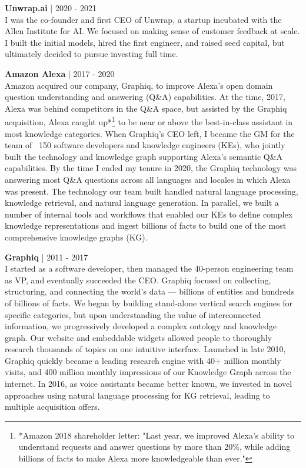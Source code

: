 \documentclass[a4paper,10pt]{article}
\begin{document}
\vspace{5pt} %

\noindent
\textbf{Unwrap.ai} | 2020 - 2021 \\
I was the co-founder and first CEO of Unwrap, a startup incubated with the Allen Institute for AI. We focused on making sense of customer feedback at scale. I built the initial models, hired the first engineer, and raised seed capital, but ultimately decided to pursue investing full time.

\vspace{5pt} %

\noindent
\textbf{Amazon Alexa} | 2017 - 2020 \\
Amazon acquired our company, Graphiq, to improve Alexa's open domain question understanding and answering (Q\&A) capabilities. At the time, 2017, Alexa was behind competitors in the Q\&A space, but assisted by the Graphiq acquisition, Alexa caught up*\footnote{*Amazon 2018 shareholder letter: "Last year, we improved Alexa’s ability to understand requests and answer questions by more than 20\%, while adding billions of facts to make Alexa more knowledgeable than ever."}  to be near or above the best-in-class assistant in most knowledge categories. When Graphiq's CEO left, I became the GM for the team of ~150 software developers and knowledge engineers (KEs), who jointly built the technology and knowledge graph supporting Alexa's semantic Q\&A capabilities. By the time I ended my tenure in 2020, the Graphiq technology was answering most Q\&A questions across all languages and locales in which Alexa was present. The technology our team built handled natural language processing, knowledge retrieval, and natural language generation. In parallel, we built a number of internal tools and workflows that enabled our KEs to define complex knowledge representations and ingest billions of facts to build one of the most comprehensive knowledge graphs (KG).

\vspace{5pt} %

\noindent
\textbf{Graphiq} | 2011 - 2017 \\
I started as a software developer, then managed the 40-person engineering team as VP, and eventually succeeded the CEO. Graphiq focused on collecting, structuring, and connecting the world’s data — billions of entities and hundreds of billions of facts. We began by building stand-alone vertical search engines for specific categories, but upon understanding the value of interconnected information, we progressively developed a complex ontology and knowledge graph. Our website and embeddable widgets allowed people to thoroughly research thousands of topics on one intuitive interface. Launched in late 2010, Graphiq quickly became a leading research engine with 40+ million monthly visits, and 400 million monthly impressions of our Knowledge Graph across the internet. In 2016, as voice assistants became better known, we invested in novel approaches using natural language processing for KG retrieval, leading to multiple acquisition offers.
\end{document}
